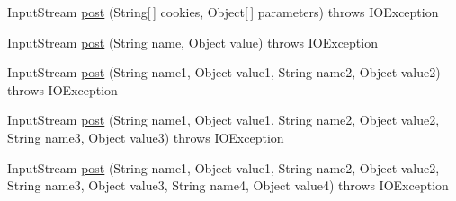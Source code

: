 \begin{DoxyCompactItemize}
\item 
InputStream \hyperlink{classj_bittorrent_a_p_i_1_1_client_http_request_a5672c2238a4736a14b0a1af6ee86f527}{post} (String\mbox{[}$\,$\mbox{]} cookies, Object\mbox{[}$\,$\mbox{]} parameters)  throws IOException 
\item 
InputStream \hyperlink{classj_bittorrent_a_p_i_1_1_client_http_request_a607da2c2ac9464fae658e06550d39e3e}{post} (String name, Object value)  throws IOException 
\item 
InputStream \hyperlink{classj_bittorrent_a_p_i_1_1_client_http_request_ab11b408775fe9d5277cfefb4e52041e9}{post} (String name1, Object value1, String name2, Object value2)  throws IOException 
\item 
InputStream \hyperlink{classj_bittorrent_a_p_i_1_1_client_http_request_af66232ad6754f2c5b74c9f48dc36d974}{post} (String name1, Object value1, String name2, Object value2, String name3, Object value3)  throws IOException 
\item 
InputStream \hyperlink{classj_bittorrent_a_p_i_1_1_client_http_request_a56aa948898030309cc3989b6b57fcea7}{post} (String name1, Object value1, String name2, Object value2, String name3, Object value3, String name4, Object value4)  throws IOException 
\end{DoxyCompactItemize}
